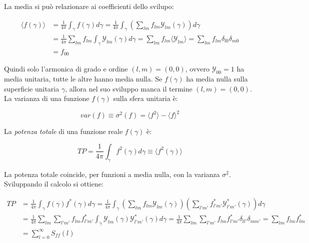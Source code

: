 \documentclass[a4paper,12pt]{book}
\begin{document}
\noindent La media si può relazionare ai coefficienti dello svilupo:

\begin{align}
    \langle f (\gamma) \rangle &= \frac{1}{4 \pi} \int_\gamma f(\gamma)d\gamma = \frac{1}{4 \pi} \int_\gamma \left( \sum_{lm} f_{lm} \mathcal{Y}_{lm} (\gamma) \right)d\gamma \\ &= \frac{1}{4 \pi} \sum_{lm} f_{lm} \int_\gamma \mathcal{Y}_{lm} (\gamma) d\gamma = \sum_{lm} f_{lm} \langle \mathcal{Y}_{lm} \rangle = \sum_{lm} f_{lm} \delta_{l0} \delta_{m0} \\ &= f_{00} 
\end{align}

\noindent
Quindi solo l'armonica di grado e ordine $(l,m) = (0,0)$, ovvero $\mathcal{Y}_{00} = 1$ ha media unitaria, tutte le altre hanno media nulla.
Se $f(\gamma)$ ha media nulla sulla superficie unitaria $\gamma$, allora nel suo sviluppo manca il termine $(l,m) = (0,0)$.\\

\noindent
La varianza di una funzione $f(\gamma)$ sulla sfera unitaria è:

\begin{equation}
    var(f) \equiv \sigma^2 (f) = \langle f^2 \rangle - \langle f \rangle^2
\end{equation}

\noindent La \textit{potenza totale} di una funzione reale $f(\gamma)$ è:

\begin{equation}
    TP = \frac{1}{4 \pi} \int_\gamma f^2 (\gamma) d \gamma \equiv \langle f^2(\gamma) \rangle
\end{equation}

\noindent
La potenza totale coincide, per funzioni a media nulla, con la varianza $\sigma^2$.
Sviluppando il calcolo si ottiene:

\begin{align}
    TP &= \frac{1}{4 \pi} \int_\gamma f(\gamma)f^*(\gamma)d\gamma = \frac{1}{4 \pi} \int_\gamma \left( \sum_{lm} f_{lm} \mathcal{Y}_{lm} (\gamma) \right) \left( \sum_{l'm'} f^*_{l'm'} \mathcal{Y}^*_{l'm'} (\gamma) \right)d\gamma \\ &= \frac{1}{4 \pi} \sum_{lm}  \sum_{l'm'}f_{lm} f^*_{l'm'} \int_\gamma \mathcal{Y}_{lm} (\gamma) \mathcal{Y}^*_{l'm'} (\gamma) d\gamma = \frac{1}{4 \pi} \sum_{lm}  \sum_{l'm'}f_{lm} f^*_{l'm'} \delta_{ll'} \delta_{mm'} = \sum_{lm} f_{lm} f^*_{lm} \\ &= \sum_{l=0}^\infty S_{ff}(l)
\end{align}
\end{document}

